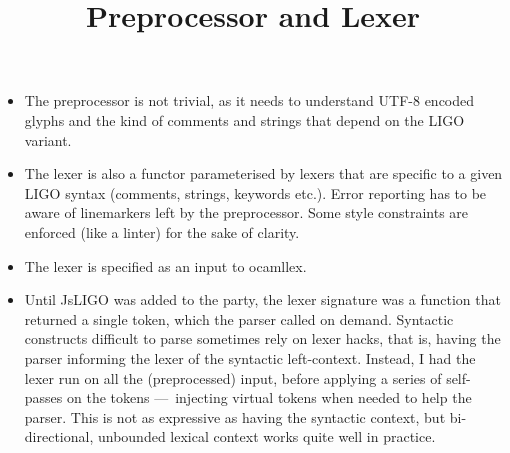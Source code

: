 \documentclass[wide]{slides}
\begin{document}
\begin{slide}
  \title{Preprocessor and Lexer}

  \begin{itemize}

    \item The preprocessor is not trivial, as it needs to understand
      UTF-8 encoded glyphs and the kind of comments and strings that
      depend on the LIGO variant.

    \item The lexer is also a functor parameterised by lexers that are
      specific to a given LIGO syntax (comments, strings, keywords
      etc.). Error reporting has to be aware of linemarkers left by
      the preprocessor. Some style constraints are enforced (like a
      linter) for the sake of clarity.

    \item The lexer is specified as an input to \textsf{ocamllex}.

    \item Until \textsf{JsLIGO} was added to the party, the lexer
      signature was a function that returned a single token, which the
      parser called on demand. Syntactic constructs difficult to parse
      sometimes rely on lexer hacks, that is, having the parser
      informing the lexer of the syntactic left\hyp{}context. Instead,
      I had the lexer run on all the (preprocessed) input, before
      applying a series of self\hyp{}passes on the tokens
      ---~injecting virtual tokens when needed to help the
      parser. This is not as expressive as having the syntactic
      context, but bi\hyp{}directional, unbounded lexical context
      works quite well in practice.

  \end{itemize}
\end{slide}
\end{document}

